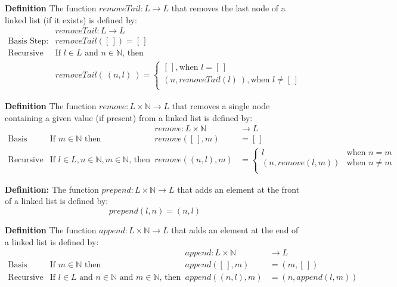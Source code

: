 \documentclass[12pt, oneside]{article}
\begin{document}
{\bf Definition} The function $\textit{removeTail} : L  \to L$ that removes the last node of a linked list (if it 
exists) is defined by:
\[
\begin{array}{llll}
& \textit{removeTail} : L \to L \\
\textrm{Basis Step:} &  \textit{removeTail}([\,]) = [\,]\\
\textrm{Recursive Step:} & \textrm{If } l \in L\textrm{ and }n \in \mathbb{N}\textrm{, then  }\\&\textit{removeTail}(~(n, l)~) 
= 
\begin{cases}
   [\,], \textrm{when } l = [\,] \\
   (n, removeTail(l)~),
   \textrm{when } l \neq [\,] \\
\end{cases}

\end{array}
\]

{\bf Definition} The function $\textit{remove} : L \times \mathbb{N} \to L$ 
that removes a single node containing a given value (if present) from a linked list is defined by:
\[
\begin{array}{llll}
& & \textit{remove} : L \times \mathbb{N} & \to L \\
\textrm{Basis Step:} & \textrm{If } m \in \mathbb{N}\textrm{ then } & \textit{remove}([\,], m) & = [\,] \\
\textrm{Recursive Step:} & \textrm{If } l \in L, n \in \mathbb{N}, m \in \mathbb{N}\textrm{, then  } & \textit{remove}((n, l), m) & =
    \begin{cases}
       l & \textrm{when } n = m \\
       (n, \textit{remove}(l, m)) & \textrm{when } n \neq m \\
    \end{cases}
\end{array}
\]

{\bf Definition:} The function $prepend : L \times \mathbb{N} \to L$ that adds an element at the front of a linked list is defined
by:
\[
prepend(l, n) = (n, l)
\]


{\bf Definition} The function $\textit{append} : L \times \mathbb{N} \to L$ that adds an element at the end of a linked list is defined by:
\[
\begin{array}{llll}
& & \textit{append} : L \times \mathbb{N} & \to L \\
\textrm{Basis Step:} & \textrm{If } m \in \mathbb{N}\textrm{ then } & \textit{append}([\,], m) & = (m, [\,]) \\
\textrm{Recursive Step:} & \textrm{If } l \in L\textrm{ and }n \in \mathbb{N}\textrm{ and }m \in \mathbb{N}\textrm{, then  } & \textit{append}((n, l), m) & = (n, \textit{append}(l, m))
\end{array}
\]
\end{document}
